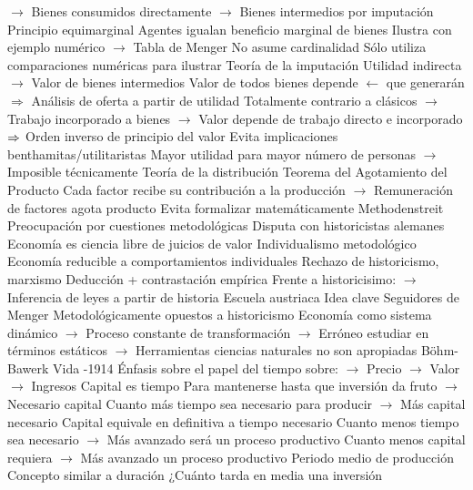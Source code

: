 \documentclass{nuevotema}
\begin{document}
\begin{esquemal}
				\4[] $\to$ Bienes consumidos directamente
				\4[] $\to$ Bienes intermedios por imputación
				\4 Principio equimarginal
				\4[] Agentes igualan beneficio marginal de bienes
				\4[] Ilustra con ejemplo numérico
				\4[] $\to$ Tabla de Menger
				\4 No asume cardinalidad
				\4[] Sólo utiliza comparaciones numéricas para ilustrar
				\4 Teoría de la imputación
				\4[] Utilidad indirecta $\to$ Valor de bienes intermedios
				\4[] Valor de todos bienes depende $\leftarrow$ que generarán
				\4[] $\Rightarrow$ Análisis de oferta a partir de utilidad
				\4[] Totalmente contrario a clásicos
				\4[] $\to$ Trabajo incorporado a bienes
				\4[] $\to$ Valor depende de trabajo directo e incorporado
				\4[] $\Rightarrow$ Orden inverso de principio del valor
				\4 Evita implicaciones benthamitas/utilitaristas
				\4[] Mayor utilidad para mayor número de personas
				\4[] $\to$ Imposible técnicamente
			\3 Teoría de la distribución
				\4 Teorema del Agotamiento del Producto
				\4[] Cada factor recibe su contribución a la producción
				\4[] $\to$ Remuneración de factores agota producto
				\4 Evita formalizar matemáticamente
			\3 Methodenstreit
				\4 Preocupación por cuestiones metodológicas
				\4 Disputa con historicistas alemanes
				\4 Economía es ciencia libre de juicios de valor
				\4 Individualismo metodológico
				\4[] Economía reducible a comportamientos individuales
				\4[] Rechazo de historicismo, marxismo
				\4 Deducción + contrastación empírica
				\4[] Frente a historicisimo:
				\4[] $\to$ Inferencia de leyes a partir de historia
		\2 Escuela austriaca
			\3 Idea clave
				\4 Seguidores de Menger
				\4 Metodológicamente opuestos a historicismo
				\4 Economía como sistema dinámico
				\4[] $\to$ Proceso constante de transformación
				\4[] $\to$ Erróneo estudiar en términos estáticos
				\4[] $\to$ Herramientas ciencias naturales no son apropiadas
			\3 Böhm-Bawerk
				\4 Vida
				-1914
				\4[] Énfasis sobre el papel del tiempo sobre:
				\4[] $\to$ Precio
				\4[] $\to$ Valor
				\4[] $\to$ Ingresos
				\4 Capital es tiempo
				\4[] Para mantenerse hasta que inversión da fruto
				\4[] $\to$ Necesario capital
				\4[] Cuanto más tiempo sea necesario para producir
				\4[] $\to$ Más capital necesario
				\4[] Capital equivale en definitiva a tiempo necesario
				\4[] Cuanto menos tiempo sea necesario
				\4[] $\to$ Más avanzado será un proceso productivo
				\4[] Cuanto menos capital requiera
				\4[] $\to$ Más avanzado un proceso productivo
				\4 Periodo medio de producción
				\4[] Concepto similar a duración
				\4[] ¿Cuánto tarda en media una inversión

\end{esquemal}
\end{document}
